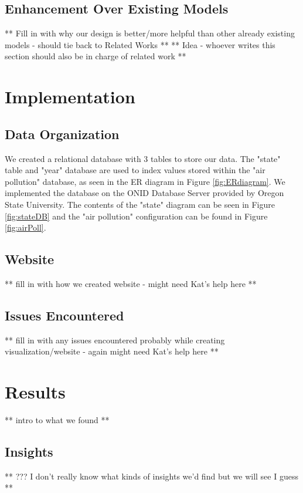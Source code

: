 \documentclass[journal]{vgtc}                %
\begin{document}
\subsection{Enhancement Over Existing Models}

** Fill in with why our design is better/more helpful than other already existing models - should tie back to Related Works **
** Idea - whoever writes this section should also be in charge of related work **

\section{Implementation}

\subsection{Data Organization}
We created a relational database with 3 tables to store our data. The "state" table and "year" database are used to
index values stored within the "air pollution" database, as seen in the ER diagram in Figure \ref{fig:ERdiagram}.
We implemented the database on the ONID Database Server provided by Oregon State University. The contents
of the "state" diagram can be seen in Figure \ref{fig:stateDB} and the "air pollution" configuration can be found in Figure \ref{fig:airPoll}.

\subsection{Website}
** fill in with how we created website - might need Kat's help here **

\subsection{Issues Encountered}
** fill in with any issues encountered probably while creating visualization/website - again might need Kat's help here **

\section{Results}
** intro to what we found **

\subsection{Insights}

** ??? I don't really know what kinds of insights we'd find but we will see I guess **
\end{document}
